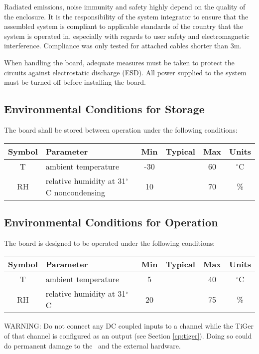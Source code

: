 	Radiated emissions, noise immunity and safety highly depend on the quality of the enclosure. It is the responsibility of the system integrator to ensure that the assembled system is compliant to applicable standards of the country that the system is operated in, especially with regards to user safety and electromagnetic interference. Compliance was only tested for attached cables shorter than 3m.\par

	When handling the board, adequate measures must be taken to protect the circuits against electrostatic discharge (ESD). All power supplied to the system must be turned off before installing the board.

	\subsection{Environmental Conditions for Storage}

	The board shall be stored between operation under the following conditions:

	\noindent
	\begin{tabularx}{\textwidth}{|c|X|c|c|c|c|}
		\hline
		Symbol & Parameter & Min & Typical & Max & Units\\
		\hline\hline
		T & ambient temperature & -30 && 60 & $^{\circ}$C\\
		\hline
		RH & relative humidity at 31$^{\circ}$C noncondensing & 10 && 70 & \%\\
		\hline
	\end{tabularx}


\subsection{Environmental Conditions for Operation}

	The board is designed to be operated under the following conditions:

	\noindent
	\begin{tabularx}{\textwidth}{|c|X|c|c|c|c|}
		\hline
		Symbol & Parameter & Min & Typical & Max & Units\\
		\hline\hline
		T & ambient temperature & 5 && 40 & $^{\circ}$C\\
		\hline
		RH & relative humidity at 31$^{\circ}$C & 20 && 75 & \%\\
		\hline
	\end{tabularx}

	WARNING: Do not connect any DC coupled inputs to a channel while the TiGer of that channel is configured as an output (see Section \ref{cp:tiger}).
	Doing so could do permanent damage to the \deviceName\ and the external hardware.

